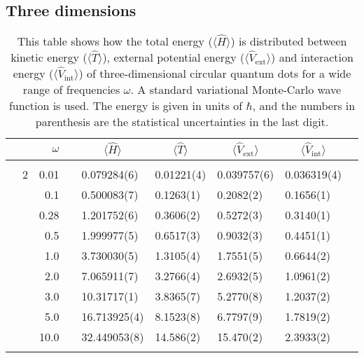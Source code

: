 \subsection{Three dimensions}
\begin{table}[H]
	\caption{This table shows how the total energy ($\langle\hat{H}\rangle$) is distributed between kinetic energy ($\langle\hat{T}\rangle$), external potential energy ($\langle\hat{V}_{\text{ext}}\rangle$) and interaction energy ($\langle\hat{V}_{\text{int}}\rangle$) of three-dimensional circular quantum dots for a wide range of frequencies $\omega$. A standard variational Monte-Carlo wave function is used. The energy is given in units of $\hbar$, and the numbers in parenthesis are the statistical uncertainties in the last digit.}
	\label{tab:splitfrequencyQDVMC3D}
	\begin{tabularx}{\textwidth}{R{1cm}rrcR{2.3cm}R{2.3cm}R{2.3cm}R{2.3cm}R{1cm}} \hline\hline
		&\makecell{\\ \phantom{$N$} \\ \phantom{=}} & $\omega$ &&  &  &  &  & \\ \hline \\
		&2 & 0.01 && 0.079284(6) & 0.01221(4) & 0.039757(6) & 0.036319(4) \\
		&& 0.1 && 0.500083(7) & 0.1263(1) & 0.2082(2) & 0.1656(1) \\
		&& 0.28 && 1.201752(6) & 0.3606(2) & 0.5272(3) & 0.3140(1) \\
		&& 0.5 && 1.999977(5) & 0.6517(3) & 0.9032(3) & 0.4451(1) \\
		&& 1.0 && 3.730030(5) & 1.3105(4) & 1.7551(5) & 0.6644(2) \\
		&& 2.0 && 7.065911(7) & 3.2766(4) & 2.6932(5) & 1.0961(2) \\
		&& 3.0 && 10.31717(1) & 3.8365(7) & 5.2770(8) & 1.2037(2) \\ 
		&& 5.0 && 16.713925(4) & 8.1523(8) & 6.7797(9) & 1.7819(2) \\
		&& 10.0 && 32.449053(8) & 14.586(2) & 15.470(2) & 2.3933(2) \\
		\hdashline \\
		

\end{tabularx}
\end{table}
